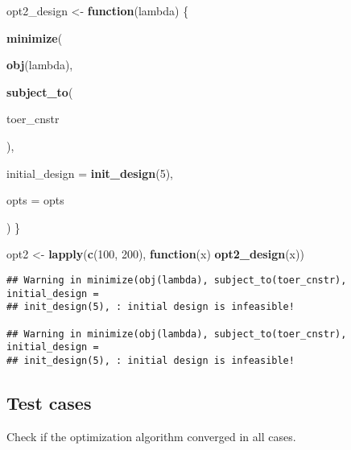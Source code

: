 \documentclass[]{book}
\newenvironment{Shaded}{\begin{snugshade}}{\end{snugshade}}
\newcommand{\ControlFlowTok}[1]{\textcolor[rgb]{0.13,0.29,0.53}{\textbf{#1}}}
\newcommand{\DataTypeTok}[1]{\textcolor[rgb]{0.13,0.29,0.53}{#1}}
\newcommand{\DecValTok}[1]{\textcolor[rgb]{0.00,0.00,0.81}{#1}}
\newcommand{\KeywordTok}[1]{\textcolor[rgb]{0.13,0.29,0.53}{\textbf{#1}}}
\newcommand{\NormalTok}[1]{#1}
\newcommand{\OperatorTok}[1]{\textcolor[rgb]{0.81,0.36,0.00}{\textbf{#1}}}
\newcommand{\StringTok}[1]{\textcolor[rgb]{0.31,0.60,0.02}{#1}}
\begin{document}
\begin{Shaded}
\begin{Highlighting}[]
\NormalTok{opt2_design <-}\StringTok{ }\ControlFlowTok{function}\NormalTok{(lambda) \{}

    \KeywordTok{minimize}\NormalTok{(}
        
        \KeywordTok{obj}\NormalTok{(lambda),}
        
        \KeywordTok{subject_to}\NormalTok{(}
            
\NormalTok{            toer_cnstr}

\NormalTok{        ),}
        
        \DataTypeTok{initial_design =} \KeywordTok{init_design}\NormalTok{(}\DecValTok{5}\NormalTok{),}
        
        \DataTypeTok{opts =}\NormalTok{ opts}
        
\NormalTok{)}
\NormalTok{\}}

\NormalTok{opt2 <-}\StringTok{ }\KeywordTok{lapply}\NormalTok{(}\KeywordTok{c}\NormalTok{(}\DecValTok{100}\NormalTok{, }\DecValTok{200}\NormalTok{), }\ControlFlowTok{function}\NormalTok{(x) }\KeywordTok{opt2_design}\NormalTok{(x))}
\end{Highlighting}
\end{Shaded}

\begin{verbatim}
## Warning in minimize(obj(lambda), subject_to(toer_cnstr), initial_design =
## init_design(5), : initial design is infeasible!

## Warning in minimize(obj(lambda), subject_to(toer_cnstr), initial_design =
## init_design(5), : initial design is infeasible!
\end{verbatim}

\hypertarget{test-cases-11}{%
\subsection{Test cases}\label{test-cases-11}}

Check if the optimization algorithm converged in all cases.

\begin{Shaded}
\end{Shaded}
\end{document}

